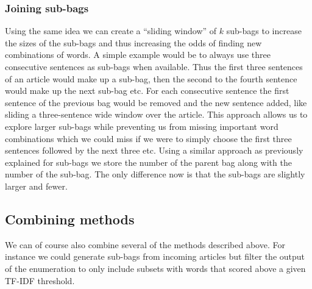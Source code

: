 \subsubsection{Joining sub-bags}
Using the same idea we can create a ``sliding window'' of $k$ sub-bags to increase the sizes of the sub-bags and thus increasing the odds of finding new combinations of words. A simple example would be to always use three consecutive sentences as sub-bags when available. Thus the first three sentences of an article would make up a sub-bag, then the second to the fourth sentence would make up the next sub-bag etc. For each consecutive sentence the first sentence of the previous bag would be removed and the new sentence added, like sliding a three-sentence wide window over the article. This approach allows us to explore larger sub-bags while preventing us from missing important word combinations which we could miss if we were to simply choose the first three sentences followed by the next three etc. Using a similar approach as previously explained for sub-bags we store the number of the parent bag along with the number of the sub-bag. The only difference now is that the sub-bags are slightly larger and fewer.

\subsection{Combining methods}
We can of course also combine several of the methods described above. For instance we could generate sub-bags from incoming articles but filter the output of the enumeration to only include subsets with words that scored above a given TF-IDF threshold.
